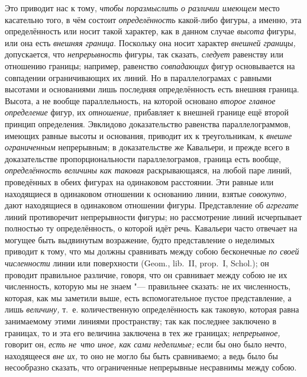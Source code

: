 Это приводит нас к тому, {\em чтобы поразмыслить о различии имеющем} место
касательно того, в чём состоит {\em определённость} какой-либо фигуры, а
именно, эта определённость или носит такой характер, как в данном случае
{\em высота} фигуры, или она есть {\em внешняя граница}. Поскольку она носит
характер {\em внешней границы,} допускается, что {\em непрерывность} фигуры,
так сказать, {\em следует} равенству или отношению границы; например, равенство
{\em совпадающих} фигур основывается на совпадении ограничивающих их линий. Но
в параллелограмах с равными высотами и основаниями лишь последняя
определённость есть внешняя граница. Высота, а не вообще параллельность, на
которой основано {\em второе главное определение} фигур, их {\em отношение,}
прибавляет к внешней границе ещё второй принцип определения. Эвклидово
доказательство равенства параллелограммов, имеющих равные высоты и основания,
приводит их к треугольникам, к {\em внешне ограниченным} непрерывным; в
доказательстве же Кавальери, и прежде всего в доказательстве пропорциональности
параллелограмов, граница есть вообще, {\em определённость величины как таковая}
раскрывающаяся, на любой паре линий, проведённых в обеих фигурах на одинаковом
расстоянии. Эти равные или находящиеся в одинаковом отношении к основанию
линии, взятые {\em совокупно,} дают находящиеся в одинаковом отношении фигуры.
Представление об {\em агрегате} линий противоречит непрерывности фигуры; но
рассмотрение линий исчерпывает полностью ту определённость, о которой идёт
речь. Кавальери часто отвечает на могущее быть выдвинутым возражение, будто
представление о неделимых приводит к тому, что мы должны сравнивать между собою
бесконечные {\em по своей численности} линии или поверхности (Geom., lib.~II,
prop.~I, Schol.); он проводит правильное различие, говоря, что он сравнивает
между собою не их численность, которую мы не знаем "--- правильнее сказать: не
их численность, которая, как мы заметили выше, есть вспомогательное пустое
представление, а лишь {\em величину,} т.~е. количественную определённость как
таковую, которая равна занимаемому этими линиями пространству; так как
последнее заключено в границах, то и эта его величина заключена в тех же
границах; {\em непрерывное,} говорит он, {\em есть не~что иное, как сами
неделимые;} если бы оно было нечто, находящееся {\em вне их,} то оно не могло
бы быть сравниваемо; а ведь было бы несообразно сказать, что ограниченные
непрерывные несравнимы между собою.

